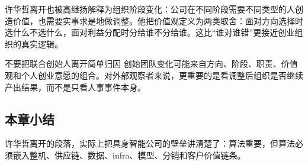 许华哲离开也被高继扬解释为组织阶段变化：公司在不同阶段需要不同类型的人创造价值，也需要实事求是地做调整。他把价值观定义为两类取舍：面对方向选择时选什么不选什么，面对利益分配时分给谁不分给谁。这比“谁对谁错”更接近创业组织的真实逻辑。

\begin{warningbox}{不要把联合创始人离开简单归因}
创始团队变化可能来自方向、阶段、职责、价值观和个人创业意愿的组合。对外部观察者来说，更重要的是看调整后组织是否继续产出结果，而不是只看人事事件本身。
\end{warningbox}

\subsection{本章小结}

许华哲离开的段落，实际上把具身智能公司的壁垒讲清楚了：算法重要，但算法必须嵌入整机、供应链、数据、infra、模型、分销和客户价值链条。

